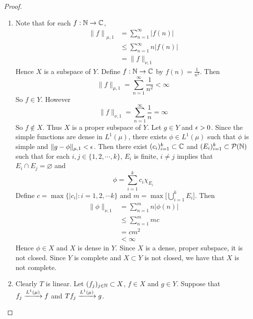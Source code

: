 \documentclass{book}
\begin{document}
	\begin{proof}\
		\begin{enumerate}
			\item Note that for each $f: \mathbb{N} \rightarrow \mathbb{C}$, 
			\begin{align*}
				{\|f \|}_{\mu, 1}
				&= \sum_{n=1}^{\infty} \vert f(n) \vert  \\
				& \leq \sum_{n=1}^{\infty} n \vert f(n) \vert  \\
				& = \|f \|_{\nu,1} 
			\end{align*} 
			Hence $X$ is a subspace of $Y$. Define $f : \mathbb{N} \rightarrow \mathbb{C}$ by $f(n) = \frac{1}{n^2}$. Then $$\|f \|_{\mu, 1} = \sum_{n=1}^{\infty} \frac{1}{n^2} < \infty$$ So  $f \in Y$. 
			However 
			$$\|f \|_{\nu, 1} = \sum_{n=1}^\infty \frac{1}{n} = \infty$$ 
			So $f \not \in X$. Thus $X$ is a proper subspace of $Y$. Let $g \in Y$ and $\epsilon >0$. Since the simple functions are dense in $L^1(\mu)$, there exists $\phi \in L^1(\mu)$ such that $\phi$ is simple and $\|g - \phi \|_{\mu ,1} < \epsilon$. Then there exist $(c_i)_{i=1}^k \subset \mathbb{C}$ and $ (E_i)_{i=1}^k \subset \mathcal{P}(\mathbb{N})$ such that for each $i,j \in  \{1,2,\cdots, k\}$, $E_i$ is finite, $i \neq j$ implies that $E_i \cap E_j = \varnothing$ and  
			$$\phi = \sum_{i=1}^kc_i \chi_{E_i}$$ 
			Define $c = \max\{\vert c_i \vert: i=1,2,\cdots k\}$ and $m = \max \bigg[ \bigcup\limits_{i=1}^k E_i \bigg]$. Then 
			\begin{align*}
				\|\phi \|_{\nu,1} 
				&=  \sum_{n=1}^m n \vert \phi(n) \vert \\
				& \leq \sum_{n=1}^m  mc \\
				& = c m^2 \\
				& < \infty
			\end{align*}
			Hence $\phi \in X$ and $X$ is dense in $Y$. Since $X$ is a dense, proper subspace, it is not closed. Since $Y$ is complete and $X \subset Y$ is not closed, we have that $X$ is not complete.
			\item Clearly $T$ is linear. Let $(f_j)_{j \in \mathbb{N}} \subset X$, $f \in X$ and $g \in Y$. Suppose that $f_j \xrightarrow{L^1(\mu)} f$ and $Tf_j \xrightarrow{L^1(\mu)} g$. 
			

\end{enumerate}
\end{proof}
\end{document}
